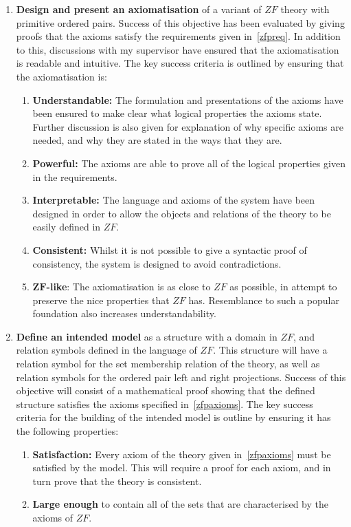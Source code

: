 \documentclass[11pt]{report}
\theoremstyle{definition}
\theoremstyle{theorem}
\theoremstyle{lemma}
\begin{document}
\begin{enumerate}
  \item \textbf{Design and present an axiomatisation} of a variant of $\mathit{ZF}$ theory with primitive ordered pairs. 
  Success of this objective has been evaluated by giving proofs that the axioms satisfy the requirements given in~\ref{zfpreq}.
  In addition to this, discussions with my supervisor have ensured that the axiomatisation is readable and intuitive. 
  The key success criteria is outlined by ensuring that the axiomatisation is: 
  \begin{enumerate}
    \item \textbf{Understandable:} The formulation and presentations of the axioms have been ensured to make clear what logical properties the axioms state. Further discussion is also given for explanation of why specific axioms are needed, and why they are stated in the ways that they are. 
    \item \textbf{Powerful:} The axioms are able to prove all of the logical properties given in the requirements. 
    \item \textbf{Interpretable:} The language and axioms of the system have been designed in order to allow the objects and relations of the theory to be easily defined in $\mathit{ZF}$.
    \item \textbf{Consistent:} Whilst it is not possible to give a syntactic proof of consistency, the system is designed to avoid contradictions. 
    \item \textbf{$\mathbf{ZF}$-like}: The axiomatisation is as close to $\mathit{ZF}$ as possible, in attempt to preserve the nice properties that $\mathit{ZF}$ has.
    Resemblance to such a popular foundation also increases understandability.  
  \end{enumerate}  

  \item \textbf{Define an intended model} as a structure with a domain in $\mathit{ZF}$, and relation symbols defined in the language of $\mathit{ZF}$. 
  This structure will have a relation symbol for the set membership relation of the theory, as well as relation symbols for the ordered pair left and right projections.
  Success of this objective will consist of a mathematical proof showing that the defined structure satisfies the axioms specified in~\ref{zfpaxioms}.
  The key success criteria for the building of the intended model is outline by ensuring it has the following properties:
  \begin{enumerate}
    \item \textbf{Satisfaction:} Every axiom of the theory given in~\ref{zfpaxioms} must be satisfied by the model. This will require a proof for each axiom, and in turn prove that the theory is consistent. 
    \item \textbf{Large enough} to contain all of the sets that are characterised by the axioms of $\mathit{ZF}$.
  \end{enumerate} 


\end{enumerate}
\end{document}
